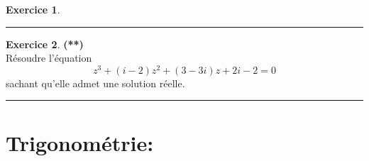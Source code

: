 \documentclass[a4paper,11pt]{article}
\theoremstyle{definition}
\newtheorem{exo}{Exercice} %
\begin{document}
\begin{minipage}{1\linewidth}
\begin{minipage}[c]{0.48\linewidth}
\begin{exo}
			\centering
			\rule{1\linewidth}{0.6pt}
		\end{exo}
	
	\begin{exo}\textbf{(**)}\quad\\[0.2cm]
		
	Résoudre l’équation $$z^3 + (i - 2)z^2 + (3 - 3i)z + 2i - 2 = 0$$ sachant qu'elle admet
	une solution réelle.
		
		
		\centering
		\rule{1\linewidth}{0.6pt}
	\end{exo}
		
		
		
		
	\end{minipage}
\end{minipage}

\section*{Trigonométrie:}\hfill\\%
\end{document}
